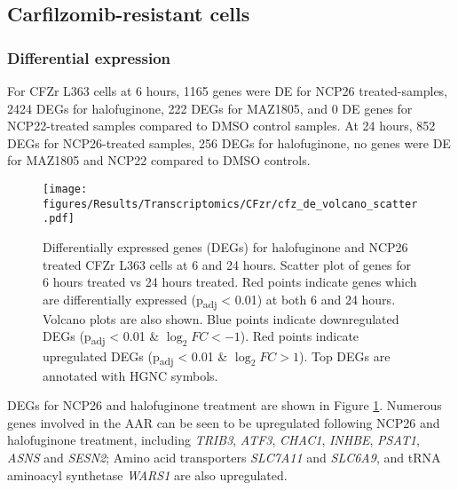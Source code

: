 
\afterpage{\clearpage}
\subsection{Carfilzomib-resistant cells}

\subsubsection{Differential expression}
For CFZr L363 cells at 6 hours, 1165 genes were DE for NCP26 treated-samples, 2424 DEGs for halofuginone, 222 DEGs for MAZ1805, and 0 DE genes for NCP22-treated samples compared to DMSO control samples.
At 24 hours, 852 DEGs for NCP26-treated samples, 256 DEGs for halofuginone, no genes were DE for MAZ1805 and NCP22 compared to DMSO controls.
%
\begin{figure}[bht]
\centering
\texttt{[image: figures/Results/Transcriptomics/CFzr/cfz\_de\_volcano\_scatter.pdf]}
\caption[Differentially expressed genes CFZr L363 cells]{Differentially expressed genes (DEGs) for halofuginone and NCP26 treated CFZr L363 cells at 6 and 24 hours.
Scatter plot of genes for 6 hours treated vs 24 hours treated.
Red points indicate genes which are differentially expressed (p\textsubscript{adj} < 0.01) at both 6 and 24 hours.
Volcano plots are also shown.
Blue points indicate downregulated DEGs (p\textsubscript{adj} < 0.01 \& $\log_{2}FC < -1$).
Red points indicate upregulated DEGs (p\textsubscript{adj} < 0.01 \& $\log_{2}FC > 1$).
Top DEGs are annotated with HGNC symbols.
}
\label{fig:cfz_de}
\end{figure}
DEGs for NCP26 and halofuginone treatment are shown in Figure \ref{fig:cfz_de}.
Numerous genes involved in the AAR can be seen to be upregulated following NCP26 and halofuginone treatment, including \textit{TRIB3}, \textit{ATF3}, \textit{CHAC1}, \textit{INHBE}, \textit{PSAT1}, \textit{ASNS} and \textit{SESN2};
Amino acid transporters \textit{SLC7A11} and \textit{SLC6A9}, and tRNA aminoacyl synthetase \textit{WARS1} are also upregulated.


